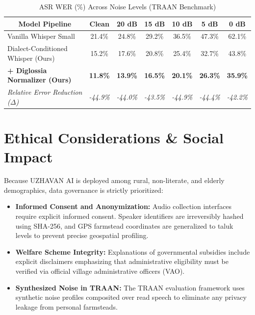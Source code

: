 \documentclass[conference]{IEEEtran}
\begin{document}
\begin{table}[t]
\centering
\caption{ASR WER (\%) Across Noise Levels (TRAAN Benchmark)}
\label{tab:traan_noise_benchmark}
\begin{tabular}{|l|c|c|c|c|c|c|}
\hline
\multicolumn{1}{|c|}{\textbf{Model Pipeline}} & \textbf{Clean} & \textbf{20 dB} & \textbf{15 dB} & \textbf{10 dB} & \textbf{5 dB} & \textbf{0 dB} \\
\hline
Vanilla Whisper Small             & 21.4\% & 24.8\% & 29.2\% & 36.5\% & 47.3\% & 62.1\% \\
\hline
Dialect-Conditioned Whisper (Ours) & 15.2\% & 17.6\% & 20.8\% & 25.4\% & 32.7\% & 43.8\% \\
\hline
\textbf{+ Diglossia Normalizer (Ours)} & \textbf{11.8\%} & \textbf{13.9\%} & \textbf{16.5\%} & \textbf{20.1\%} & \textbf{26.3\%} & \textbf{35.9\%} \\
\hline
\textit{Relative Error Reduction ($\Delta$)} & \textit{-44.9\%} & \textit{-44.0\%} & \textit{-43.5\%} & \textit{-44.9\%} & \textit{-44.4\%} & \textit{-42.2\%} \\
\hline
\end{tabular}
\end{table}

\section{Ethical Considerations \& Social Impact}
Because UZHAVAN AI is deployed among rural, non-literate, and elderly demographics, data governance is strictly prioritized:
\begin{itemize}
    \item \textbf{Informed Consent and Anonymization:} Audio collection interfaces require explicit informed consent. Speaker identifiers are irreversibly hashed using SHA-256, and GPS farmstead coordinates are generalized to taluk levels to prevent precise geospatial profiling.
    \item \textbf{Welfare Scheme Integrity:} Explanations of governmental subsidies include explicit disclaimers emphasizing that administrative eligibility must be verified via official village administrative officers (VAO).
    \item \textbf{Synthesized Noise in TRAAN:} The TRAAN evaluation framework uses synthetic noise profiles composited over read speech to eliminate any privacy leakage from personal farmsteads.
\end{itemize}
\end{document}
